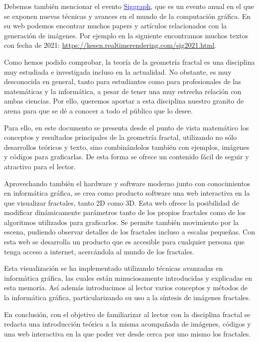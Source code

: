 Debemos también mencionar el evento \href{https://s2022.siggraph.org/}{\textcolor{blue}{Siggraph}}, que es un evento anual en el que se exponen nuevas técnicas y avances en el mundo de la computación gráfica. En su web podemos encontrar muchos papers y artículos relacionados con la generación de imágenes. Por ejemplo en la siguiente encontramos muchos textos con fecha de 2021: \url{https://kesen.realtimerendering.com/sig2021.html}.

Como hemos podido comprobar, la teoría de la geometría fractal es una disciplina muy estudiada e investigada incluso en la actualidad. No obstante, es muy desconocida en general, tanto para estudiantes como para profesionales de las matemáticas y la informática, a pesar de tener una muy estrecha relación con ambas ciencias. Por ello, queremos aportar a esta disciplina nuestro granito de arena para que se dé a conocer a todo el público que lo desee. 

Para ello, en este documento se presenta desde el punto de vista matemático los conceptos y resultados principales de la geometría fractal, utilizando no sólo desarrollos teóricos y texto, sino combinándolos también con ejemplos, imágenes y códigos para graficarlas. De esta forma se ofrece un contenido fácil de seguir y atractivo para el lector. 

Aprovechando también el hardware y software moderno junto con conocimientos en informática gráfica, se crea como producto software una web interactiva en la que visualizar fractales, tanto 2D como 3D. Esta web ofrece la posibilidad de modificar dinámicamente parámetros tanto de los propios fractales como de los algoritmos utilizados para graficarlos. Se permite también movimiento por la escena, pudiendo observar detalles de los fractales incluso a escalas pequeñas. Con esta web se desarrolla un producto que es accesible para cualquier persona que tenga acceso a internet, acercándola al mundo de los fractales.

Esta visualización se ha implementado utilizando técnicas avanzadas en informática gráfica, las cuales están minuciosamente introducidas y explicadas en esta memoria. Así además introducimos al lector varios conceptos y métodos de la informática gráfica, particularizando su uso a la síntesis de imágenes fractales.

En conclusión, con el objetivo de familiarizar al lector con la disciplina fractal se redacta una introducción teórica a la misma acompañada de imágenes, códigos y una web interactiva en la que poder ver desde cerca por uno mismo los fractales.


